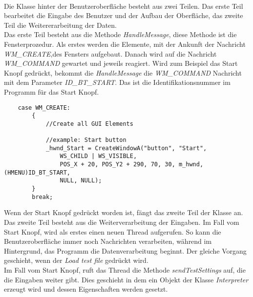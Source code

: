 \paragraph{}
Die Klasse hinter der Benutzeroberfläche besteht aus zwei Teilen. Das erste Teil bearbeitet die Eingabe des Benutzer und der Aufbau der Oberfläche, das zweite Teil die Weitererarbeitung der Daten.\\

Das erste Teil besteht aus die Methode \textit{HandleMessage}, diese Methode ist die Fensterprozedur. Als erstes werden die Elemente, mit der Ankunft der Nachricht \textit{WM\_CREATE},des Fensters aufgebaut. Danach wird auf die Nachricht \textit{WM\_COMMAND} gewartet und jeweils reagiert. Wird zum Beispiel das Start Knopf gedrückt, bekommt die \textit{HandleMessage} die \textit{WM\_COMMAND} Nachricht mit dem Parameter \textit{ID\_BT\_START}. Das ist die Identifikationsnummer im Programm für das Start Knopf.\\
\begin{lstlisting}	 
    case WM_CREATE:
        {
            //Create all GUI Elements
            
            //example: Start button
            _hwnd_Start = CreateWindowA("button", "Start",
				WS_CHILD | WS_VISIBLE,
				POS_X + 20, POS_Y2 + 290, 70, 30, m_hwnd, (HMENU)ID_BT_START,
				NULL, NULL);
        }
        break;
\end{lstlisting}

Wenn der Start Knopf gedrückt worden ist, fängt das zweite Teil der Klasse an. Das zweite Teil besteht aus die Weiterverarbeitung der Eingaben. Im Fall vom Start Knopf, wird als erstes einen neuen Thread aufgerufen. So kann die Benutzeroberfläche immer noch Nachrichten verarbeiten, während im Hintergrund, das Programm die Datenverarbeitung beginnt. Der gleiche Vorgang geschieht, wenn der \textit{Load test file} gedrückt wird.\\

Im Fall vom Start Knopf, ruft das Thread die Methode \textit{sendTestSettings} auf, die die Eingaben weiter gibt. Dies geschieht in dem ein Objekt der Klasse \textit{Interpreter} erzeugt wird und dessen Eigenschaften werden gesetzt.


